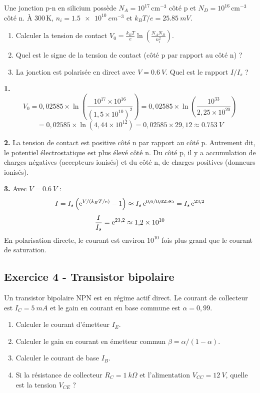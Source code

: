 \documentclass[12pt,a4paper]{article}
\begin{document}
\begin{boiteexercice}
Une jonction p-n en silicium possède $N_A = 10^{17}\,\text{cm}^{-3}$ côté p et $N_D = 10^{16}\,\text{cm}^{-3}$ côté n. À 300\,K, $n_i = \qty{1.5e10}{cm^{-3}}$ et $k_BT/e = \qty{25.85}{mV}$.
\begin{enumerate}
  \item Calculer la tension de contact $V_0 = \frac{k_BT}{e}\ln\!\left(\frac{N_A N_D}{n_i^2}\right)$.
  \item Quel est le signe de la tension de contact (côté p par rapport au côté n) ?
  \item La jonction est polarisée en direct avec $V = \qty{0.6}{V}$. Quel est le rapport $I/I_s$ ?
\end{enumerate}
\end{boiteexercice}

\begin{boitecorrige}
\textbf{1.}
\[
V_0 = 0{,}02585\times\ln\!\left(\frac{10^{17}\times10^{16}}{(1{,}5\times10^{10})^2}\right)
= 0{,}02585\times\ln\!\left(\frac{10^{33}}{2{,}25\times10^{20}}\right)
\]
\[
= 0{,}02585\times\ln(4{,}44\times10^{12}) = 0{,}02585\times29{,}12 \approx \qty{0.753}{V}
\]

\textbf{2.} La tension de contact est positive côté n par rapport au côté p. Autrement dit, le potentiel électrostatique est plus élevé côté n. Du côté p, il y a accumulation de charges négatives (accepteurs ionisés) et du côté n, de charges positives (donneurs ionisés).

\textbf{3.} Avec $V=\qty{0.6}{V}$ :
\[
I = I_s\left(\mathrm{e}^{V/(k_BT/e)}-1\right) \approx I_s\,\mathrm{e}^{0{,}6/0{,}02585} = I_s\,\mathrm{e}^{23{,}2}
\]
\[
\frac{I}{I_s} = \mathrm{e}^{23{,}2} \approx 1{,}2\times10^{10}
\]
En polarisation directe, le courant est environ $10^{10}$ fois plus grand que le courant de saturation.
\end{boitecorrige}

\subsection*{Exercice 4 - Transistor bipolaire \niveau{\difficile}}

\begin{boiteexercice}
Un transistor bipolaire NPN est en régime actif direct. Le courant de collecteur est $I_C = \qty{5}{mA}$ et le gain en courant en base commune est $\alpha = 0{,}99$.
\begin{enumerate}
  \item Calculer le courant d'émetteur $I_E$.
  \item Calculer le gain en courant en émetteur commun $\beta = \alpha/(1-\alpha)$.
  \item Calculer le courant de base $I_B$.
  \item Si la résistance de collecteur $R_C = \qty{1}{k\Omega}$ et l'alimentation $V_{CC} = \qty{12}{V}$, quelle est la tension $V_{CE}$ ?
\end{enumerate}
\end{boiteexercice}
\end{document}
